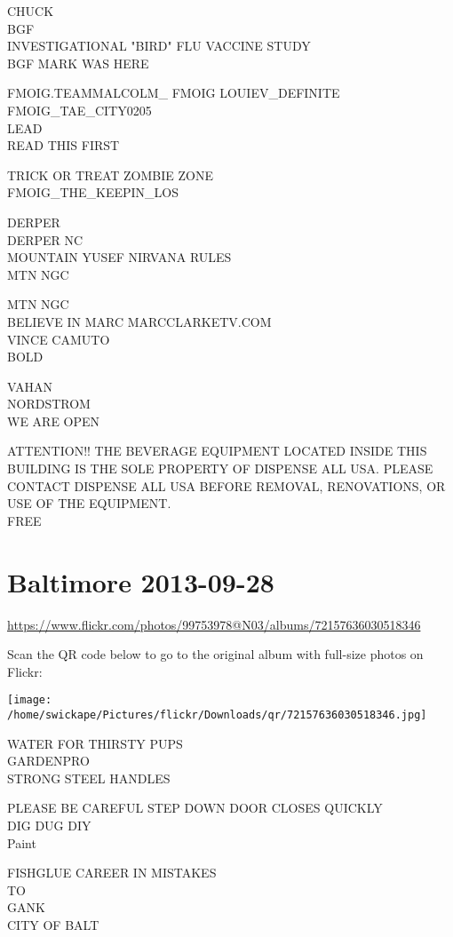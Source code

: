 \documentclass[10pt,letterpaper]{article}
\begin{document}
CHUCK\\
BGF\\
INVESTIGATIONAL "BIRD" FLU VACCINE STUDY\\
BGF MARK WAS HERE

FMOIG.TEAMMALCOLM\_ FMOIG LOUIEV\_DEFINITE FMOIG\_TAE\_CITY0205\\
LEAD\\
READ THIS FIRST

TRICK OR TREAT ZOMBIE ZONE\\
FMOIG\_THE\_KEEPIN\_LOS

DERPER\\
DERPER NC\\
MOUNTAIN YUSEF NIRVANA RULES\\
MTN NGC

MTN NGC\\
BELIEVE IN MARC MARCCLARKETV.COM\\
VINCE CAMUTO\\
BOLD

VAHAN\\
NORDSTROM\\
WE ARE OPEN

ATTENTION!! THE BEVERAGE EQUIPMENT LOCATED INSIDE THIS BUILDING IS THE SOLE PROPERTY OF DISPENSE ALL USA.  PLEASE CONTACT DISPENSE ALL USA BEFORE REMOVAL, RENOVATIONS, OR USE OF THE EQUIPMENT.\\
FREE
\pagebreak

\section*{Baltimore 2013-09-28}

\url{https://www.flickr.com/photos/99753978@N03/albums/72157636030518346}

Scan the QR code below to go to the original album with full-size photos on Flickr:

\texttt{[image: /home/swickape/Pictures/flickr/Downloads/qr/72157636030518346.jpg]}
\pagebreak

WATER FOR THIRSTY PUPS\\
GARDENPRO\\
STRONG STEEL HANDLES

PLEASE BE CAREFUL STEP DOWN DOOR CLOSES QUICKLY\\
DIG DUG DIY\\
Paint

FISHGLUE CAREER IN MISTAKES\\
TO\\
GANK\\
CITY OF BALT
\end{document}
